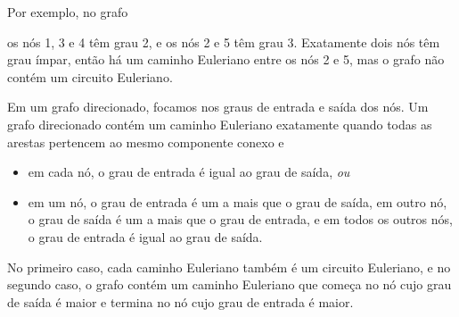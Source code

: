 \begin{samepage}
Por exemplo, no grafo
\begin{center}
\end{center}
\end{samepage}
os nós 1, 3 e 4 têm grau 2,
e os nós 2 e 5 têm grau 3.
Exatamente dois nós têm grau ímpar,
então há um caminho Euleriano entre os nós 2 e 5,
mas o grafo não contém um circuito Euleriano.

Em um grafo direcionado,
focamos nos graus de entrada e saída
dos nós.
Um grafo direcionado contém um caminho Euleriano
exatamente quando todas as arestas pertencem ao mesmo
componente conexo e
\begin{itemize}
\item em cada nó, o grau de entrada é igual ao grau de saída, \emph{ou}
\item em um nó, o grau de entrada é um a mais que o grau de saída,
em outro nó, o grau de saída é um a mais que o grau de entrada,
e em todos os outros nós, o grau de entrada é igual ao grau de saída.
\end{itemize}

No primeiro caso, cada caminho Euleriano
também é um circuito Euleriano,
e no segundo caso, o grafo contém um caminho Euleriano
que começa no nó cujo grau de saída é maior
e termina no nó cujo grau de entrada é maior.

